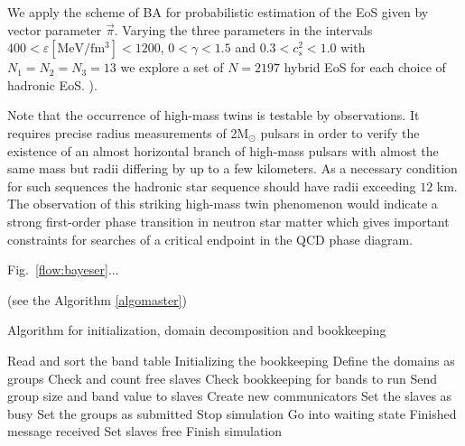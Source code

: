 
{We apply the scheme of BA for probabilistic estimation of
the EoS given by vector parameter $\vec{\pi}$. Varying the three
parameters in the intervals $400<\varepsilon[\mathrm{MeV/fm^{3}}]<1200$,
$0<\gamma<1.5$ and $0.3<{c}_{s}^{2}<1.0$ with $N_{1}=N_{2}=N_{3}=13$
we explore a set of $N=2197$ hybrid EoS for each choice of hadronic
EoS. \cite{Blaschke:2013rma,Blaschke:2013ana,Benic:2014jia}).}

{Note that the occurrence of high-mass twins is testable by
observations. It requires precise radius measurements of 2M$_{\odot}$
pulsars in order to verify the existence of an almost horizontal branch
of high-mass pulsars with almost the same mass but radii differing
by up to a few kilometers. As a necessary condition for such sequences
the hadronic star sequence should have radii exceeding $12$ km. The
observation of this striking high-mass twin phenomenon would indicate
a strong first-order phase transition in neutron star matter which
gives important constraints for searches of a critical endpoint in
the QCD phase diagram.}

Fig.~\ref{flow:bayeser}...

(see the Algorithm \ref{algomaster})

{\small
\begin{algorithm}[auto]
\label{algomaster}
 \caption{Algorithm for initialization, domain decomposition and bookkeeping}
	\SetAlgoLined
	Read and sort the band table\;
	Initializing the bookkeeping\;
	Define the domains as groups\;
	{
	Check and count free slaves\;
	Check bookkeeping for bands to run\;
		{
			{
			Send group size and band value to slaves\;
			Create new communicators\;
			Set the slaves as busy\;
			Set the groups as submitted\;
			}
		}
		{
			{Stop simulation\;}
			{
				{
				Go into waiting state\;
				Finished message received\;
				Set slaves free\;
				}
				{Finish simulation}
			}
		}
    }
\end{algorithm}
}